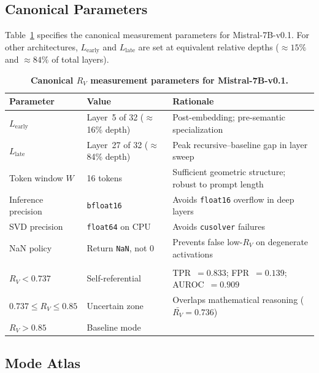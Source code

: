 \documentclass{article}
\newcommand{\RV}{R_V}
\begin{document}
\subsection{Canonical Parameters}

Table~\ref{tab:params} specifies the canonical measurement parameters for Mistral-7B-v0.1.
For other architectures, $L_\mathrm{early}$ and $L_\mathrm{late}$ are set at equivalent relative
depths (${\approx}15\%$ and ${\approx}84\%$ of total layers).

\begin{table}[h]
\centering
\caption{\textbf{Canonical $\RV$ measurement parameters for Mistral-7B-v0.1.}}
\label{tab:params}
\smallskip
\small
\begin{tabular}{>{\raggedright}p{2.8cm}p{3.0cm}p{5.0cm}}
\toprule
\textbf{Parameter} & \textbf{Value} & \textbf{Rationale} \\
\midrule
$L_\mathrm{early}$ & Layer~5 of 32 ($\approx$16\% depth) & Post-embedding; pre-semantic specialization \\
$L_\mathrm{late}$  & Layer~27 of 32 ($\approx$84\% depth) & Peak recursive--baseline gap in layer sweep \\
Token window $W$   & 16 tokens & Sufficient geometric structure; robust to prompt length \\
Inference precision & \texttt{bfloat16} & Avoids \texttt{float16} overflow in deep layers \\
SVD precision      & \texttt{float64} on CPU & Avoids \texttt{cusolver} failures \\
NaN policy         & Return \texttt{NaN}, not 0 & Prevents false low-$\RV$ on degenerate activations \\
\midrule
\multicolumn{3}{l}{\textit{Detection threshold (Mistral-7B only)}} \\
$\RV < 0.737$              & Self-referential & TPR~$= 0.833$; FPR~$= 0.139$; AUROC~$= 0.909$ \\
$0.737 \leq \RV \leq 0.85$ & Uncertain zone   & Overlaps mathematical reasoning ($\bar{\RV} = 0.736$) \\
$\RV > 0.85$               & Baseline mode    & \\
\bottomrule
\end{tabular}
\end{table}

\subsection{Mode Atlas}
\label{sec:modes}
\end{document}
